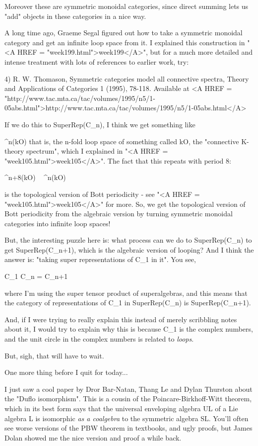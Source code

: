 Moreover these are symmetric monoidal categories, since direct 
summing lets us "add" objects in these categories in a nice way.

A long time ago, Graeme Segal figured out how to take a symmetric
monoidal category and get an infinite loop space from it.
I explained this construction in "<A HREF = "week199.html">week199</A>", but for a much more
detailed and intense treatment with lots of references to earlier 
work, try:

4) R. W. Thomason, Symmetric categories model all connective 
spectra, Theory and Applications of Categories 1 (1995), 78-118.
Available at <A HREF = "http://www.tac.mta.ca/tac/volumes/1995/n5/1-05abs.html">http://www.tac.mta.ca/tac/volumes/1995/n5/1-05abs.html</A>
  
If we do this to SuperRep(C_{n}), I think we get something like 

\Omega ^{n}(kO)
that is, the n-fold loop space of something called kO, the "connective
K-theory spectrum", which I explained in "<A HREF = "week105.html">week105</A>".  The fact that this 
repeats with period 8:

\Omega ^{n+8}(kO) ~ \Omega ^{n}(kO)

is the topological version of Bott periodicity - see "<A HREF = "week105.html">week105</A>" for more.
So, we get the topological version of Bott periodicity from the algebraic
version by turning symmetric monoidal categories into infinite loop 
spaces!  

But, the interesting puzzle here is: what process can we do to 
SuperRep(C_{n})
to get SuperRep(C_{n+1}), which is the algebraic version of looping?
And I think the answer 
is: "taking super representations of C_{1} in it".
You see, 

C_{1} \otimes  C_{n} = C_{n+1}

where I'm using the super tensor product of superalgebras, and this
means that the category of representations of C_{1} 
in SuperRep(C_{n}) 
is SuperRep(C_{n+1}).  

And, if I were trying to really explain this instead of merely scribbling
notes about it, I would try to explain why this is because C_{1} 
is the complex
numbers, and the unit circle in the complex numbers is related to 
\emph{loops}.

But, sigh, that will have to wait.

One more thing before I quit for today...

I just saw a cool paper by Dror Bar-Natan, Thang Le and Dylan Thurston
about the "Duflo isomorphism".  This is a cousin of the 
Poincare-Birkhoff-Witt 
theorem, which in its best form says that the universal enveloping 
algebra UL of a Lie algebra L is isomorphic \emph{as a coalgebra} to the 
symmetric algebra SL.  You'll often see worse versions of the PBW theorem 
in textbooks, and ugly proofs, but James Dolan showed me the nice version 
and proof a while back.

